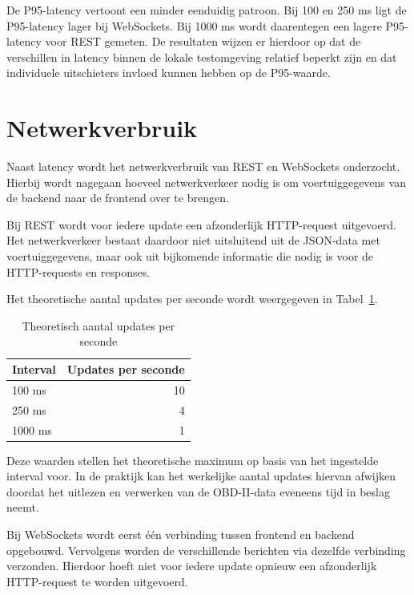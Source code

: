 De P95-latency vertoont een minder eenduidig patroon. Bij 100 en 250 ms ligt
de P95-latency lager bij WebSockets. Bij 1000 ms wordt daarentegen een lagere
P95-latency voor REST gemeten. De resultaten wijzen er hierdoor op dat de
verschillen in latency binnen de lokale testomgeving relatief beperkt zijn en
dat individuele uitschieters invloed kunnen hebben op de P95-waarde.


\section{Netwerkverbruik}

Naast latency wordt het netwerkverbruik van REST en WebSockets onderzocht.
Hierbij wordt nagegaan hoeveel netwerkverkeer nodig is om voertuiggegevens van
de backend naar de frontend over te brengen.

Bij REST wordt voor iedere update een afzonderlijk HTTP-request uitgevoerd.
Het netwerkverkeer bestaat daardoor niet uitsluitend uit de JSON-data met
voertuiggegevens, maar ook uit bijkomende informatie die nodig is voor de
HTTP-requests en responses.

Het theoretische aantal updates per seconde wordt weergegeven in
Tabel~\ref{tab:updates-per-seconde}.

\begin{table}[H]
    \centering
    \caption{Theoretisch aantal updates per seconde}
    \label{tab:updates-per-seconde}
    \begin{tabular}{lr}
        \hline
        \textbf{Interval} & \textbf{Updates per seconde} \\
        \hline
        100 ms  & 10 \\
        250 ms  & 4 \\
        1000 ms & 1 \\
        \hline
    \end{tabular}
\end{table}

Deze waarden stellen het theoretische maximum op basis van het ingestelde
interval voor. In de praktijk kan het werkelijke aantal updates hiervan
afwijken doordat het uitlezen en verwerken van de OBD-II-data eveneens tijd in
beslag neemt.

Bij WebSockets wordt eerst één verbinding tussen frontend en backend opgebouwd.
Vervolgens worden de verschillende berichten via dezelfde verbinding
verzonden. Hierdoor hoeft niet voor iedere update opnieuw een afzonderlijk
HTTP-request te worden uitgevoerd.

